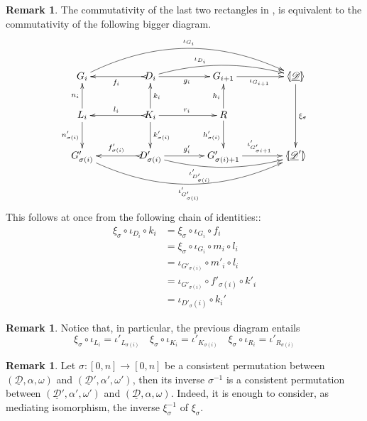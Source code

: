 \documentclass[a4paper]{article}
\newcommand{\dder}[1]{\mathscr{#1}}
\newcommand{\der}[1]{\underline{\dder{#1}}}
\newcommand{\lpro}{\langle \hspace{-1.85pt}[}
\newcommand{\rpro}{]\hspace{-1.85pt}\rangle}
\newcommand{\tpro}[1]{\lpro \der{#1}\rpro}
\theoremstyle{definition}
\newtheorem{remark}[theorem]{Remark}
\begin{document}
\begin{remark}
The commutativity of the last two rectangles in , is equivalent to the commutativity of the following bigger diagram.		
\[\xymatrix@C=40pt{G_i\ar@/^1cm/[rrr]^{\iota_{G_{i}}}&D_i\ar@/^.4cm/[rr]^(.35){\iota_{D_i}} \ar[r]_{g_i} \ar@{>->}[l]^{f_i}&G_{i+1} \ar[r]_{\iota_{G_{i+1}}}&\tpro{D} \ar[dd]^{\xi_\sigma}\\  L_i \ar[u]^{n_i} \ar[d]_{n'_{\sigma(i)}}& K_i \ar[d]^{k'_{\sigma(i)}} \ar[u]_{k_i} \ar[r]^{r_i} \ar@{>->}[l]_{l_i} &R\ar[u]^{h_i} \ar[d]_{h'_{\sigma(i)}}\\G'_{\sigma(i)}\ar@/_1cm/[rrr]_{\iota'_{G'_{\sigma(i)}}} &D'_{\sigma(i)}\ar@{>->}[l]_{f'_{\sigma(i)}} \ar[r]^{g'_i} \ar@/_.4cm/[rr]_(.35){\iota'_{D'_{\sigma(i)}}}&G'_{\sigma(i)+1} \ar[r]^{\iota'_{G'_{\sigma{i}+1}}}& \lpro\der{D}' \rpro }\]
This follows at once from the following chain of identities::
\begin{align*}
	\xi_\sigma \circ \iota_{D_i}\circ k_i&=\xi_\sigma \circ \iota_{G_{i}} \circ f_i\\&= \xi_\sigma \circ \iota_{G_{i}}\circ m_i \circ l_i\\&=\iota_{G'_{\sigma(i)}}\circ m'_i\circ l_i\\&=\iota_{G'_{\sigma(i)}}\circ f'_{\sigma(i)}\circ k'_i\\&=\iota_{D'_\sigma(i)}\circ k_i'
\end{align*}
\end{remark}

\begin{remark}\label{rem:coproj}
Notice that, in particular, the previous diagram entails
		\[\xi_\sigma \circ \iota_{L_i}=\iota'_{L_{\sigma(i)}} \quad \xi_\sigma \circ \iota_{K_i}=\iota'_{K_{\sigma(i)}} \quad \xi_\sigma \circ \iota_{R_i}=\iota'_{R_{\sigma(i)}} \]
\end{remark}

\begin{remark}\label{rem:inversa}
Let $\sigma\colon [0,n]\to [0,n]$ be a consistent permutation between $(\der{D},\alpha, \omega)$ and $(\der{D}', \alpha', \omega')$, then its inverse $\sigma^{-1}$ is a consistent permutation between $(\der{D}', \alpha', \omega')$ and $(\der{D},\alpha, \omega)$. Indeed, it is enough to consider, as mediating isomorphism, the inverse $\xi^{-1}_\sigma$ of $\xi_\sigma$.
\end{remark}
\end{document}
